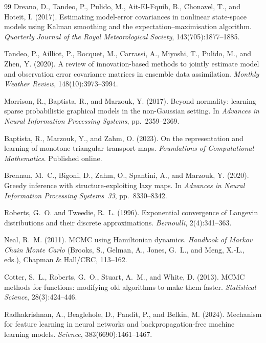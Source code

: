 \begin{thebibliography}{99}
Dreano, D., Tandeo, P., Pulido, M., Ait-El-Fquih, B., Chonavel, T., and Hoteit, I. (2017).
Estimating model-error covariances in nonlinear state-space models using Kalman smoothing and the expectation--maximisation algorithm.
\emph{Quarterly Journal of the Royal Meteorological Society}, 143(705):1877--1885.

Tandeo, P., Ailliot, P., Bocquet, M., Carrassi, A., Miyoshi, T., Pulido, M., and Zhen, Y. (2020).
A review of innovation-based methods to jointly estimate model and observation error covariance matrices in ensemble data assimilation.
\emph{Monthly Weather Review}, 148(10):3973--3994.

Morrison, R., Baptista, R., and Marzouk, Y. (2017).
Beyond normality: learning sparse probabilistic graphical models in the non-Gaussian setting.
In \emph{Advances in Neural Information Processing Systems}, pp.~2359--2369.

Baptista, R., Marzouk, Y., and Zahm, O. (2023).
On the representation and learning of monotone triangular transport maps.
\emph{Foundations of Computational Mathematics}. Published online.

Brennan, M.~C., Bigoni, D., Zahm, O., Spantini, A., and Marzouk, Y. (2020).
Greedy inference with structure-exploiting lazy maps.
In \emph{Advances in Neural Information Processing Systems~33}, pp.~8330--8342.

Roberts, G.~O. and Tweedie, R.~L. (1996).
Exponential convergence of Langevin distributions and their discrete approximations.
\emph{Bernoulli}, 2(4):341--363.

Neal, R.~M. (2011).
MCMC using Hamiltonian dynamics.
\emph{Handbook of Markov Chain Monte Carlo} (Brooks, S., Gelman, A., Jones, G.~L., and Meng, X.-L., eds.), Chapman \& Hall/CRC, 113--162.

Cotter, S.~L., Roberts, G.~O., Stuart, A.~M., and White, D. (2013).
MCMC methods for functions: modifying old algorithms to make them faster.
\emph{Statistical Science}, 28(3):424--446.

Radhakrishnan, A., Beaglehole, D., Pandit, P., and Belkin, M. (2024).
Mechanism for feature learning in neural networks and backpropagation-free machine learning models.
\emph{Science}, 383(6690):1461--1467.


\end{thebibliography}
